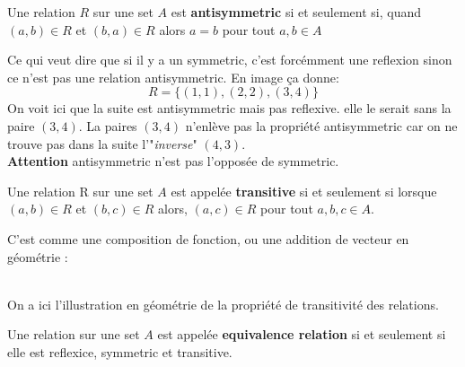 \begin{definition}[Antisymmetric]
    Une relation $R$ sur une set $A$ est \textbf{antisymmetric} si et seulement si, quand $(a, b) \in R$ et $(b, a) \in R$ alors $a = b$ pour tout $a, b \in A$
\end{definition}
Ce qui veut dire que si il y a un symmetric, c'est forcémment une reflexion sinon ce n'est pas une relation antisymmetric. En image ça donne: 
\begin{equation*}
    R = \{ (1, 1), (2, 2), (3, 4)\}
\end{equation*}
On voit ici que la suite est antisymmetric mais pas reflexive. elle le serait sans la paire $(3, 4)$. La paires $(3, 4)$ n'enlève pas la propriété antisymmetric car on ne trouve pas dans la suite l'"\textit{inverse}" $(4, 3)$. 
\\
\textbf{Attention} antisymmetric n'est pas l'opposée de symmetric.


\begin{definition}[Transitive]
    Une relation R sur une set $A$ est appelée \textbf{transitive} si et seulement si lorsque $(a, b) \in R$ et $(b, c) \in R$ alors, $(a, c) \in R$ pour tout $a, b, c \in A$.
\end{definition}
C'est comme une composition de fonction, ou une addition de vecteur en géométrie :


\begin{center}
    
\end{center}
\\
On a ici l'illustration en géométrie de la propriété de transitivité des relations.


\begin{definition}
    Une relation sur une set $A$ est appelée \textbf{equivalence relation} si et seulement si elle est reflexice, symmetric et transitive.
\end{definition}


